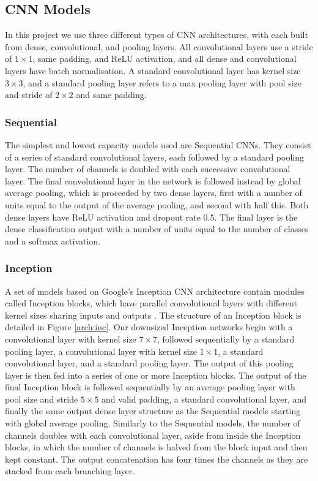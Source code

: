 \documentclass[12pt]{article}
\begin{document}
\subsection{CNN Models}
In this project we use three different types of CNN architectures, with each built from dense, convolutional, and pooling layers. All convolutional layers use a stride of $1\times1$, same padding, and ReLU activation, and all dense and convolutional layers have batch normalisation. A standard convolutional layer has kernel size $3\times3$, and a standard pooling layer refers to a max pooling layer with pool size and stride of $2\times2$ and same padding.

\subsubsection{Sequential}
The simplest and lowest capacity models used are Sequential CNNs. They consist of a series of standard convolutional layers, each followed by a standard pooling layer. The number of channels is doubled with each successive convolutional layer. The final convolutional layer in the network is followed instead by global average pooling, which is proceeded by two dense layers, first with a number of units equal to the output of the average pooling, and second with half this. Both dense layers have ReLU activation and dropout rate 0.5. The final layer is the dense classification output with a number of units equal to the number of classes and a softmax activation.

\subsubsection{Inception}
A set of models based on Google's Inception CNN architecture contain modules called Inception blocks, which have parallel convolutional layers with different kernel sizes sharing inputs and outputs \cite{Szegedy15}. The structure of an Inception block is detailed in Figure \ref{arch:inc}. Our downsized Inception networks begin with a convolutional layer with kernel size $7\times7$, followed sequentially by a standard pooling layer, a convolutional layer with kernel size $1\times1$, a standard convolutional layer, and a standard pooling layer. The output of this pooling layer is then fed into a series of one or more Inception blocks. The output of the final Inception block is followed sequentially by an average pooling layer with pool size and stride $5\times5$ and valid padding, a standard convolutional layer, and finally the same output dense layer structure as the Sequential models starting with global average pooling. Similarly to the Sequential models, the number of channels doubles with each convolutional layer, aside from inside the Inception blocks, in which the number of channels is halved from the block input and then kept constant. The output concatenation has four times the channels as they are stacked from each branching layer.
\end{document}
